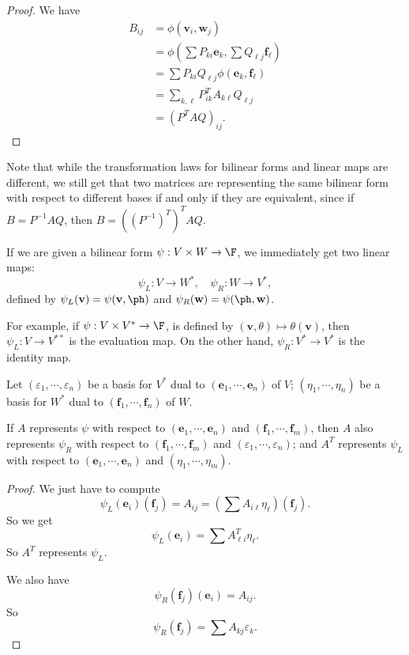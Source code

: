 \documentclass[a4paper]{article}
\begin{document}
\begin{proof}
  We have
  \begin{align*}
    B_{ij} &= \phi(\mathbf{v}_i, \mathbf{w}_j)\\
    &= \phi\left(\sum P_{ki}\mathbf{e}_k, \sum Q_{\ell j}\mathbf{f}_\ell\right)\\
    &= \sum P_{ki}Q_{\ell j}\phi(\mathbf{e}_k, \mathbf{f}_\ell)\\
    &= \sum_{k, \ell} P^T_{ik} A_{k\ell} Q_{\ell j}\\
    &= (P^T AQ)_{ij}.
  \end{align*}
\end{proof}
Note that while the transformation laws for bilinear forms and linear maps are different, we still get that two matrices are representing the same bilinear form with respect to different bases if and only if they are equivalent, since if $B = P^{-1} AQ$, then $B = ((P^{-1})^T)^T AQ$.

If we are given a bilinear form $\psi: V\times W \to \F$, we immediately get two linear maps:
\[
  \psi_L: V\to W^*,\quad \psi_R: W \to V^*,
\]
defined by $\psi_L(\mathbf{v}) = \psi(\mathbf{v}, \ph)$ and $\psi_R(\mathbf{w}) = \psi(\ph, \mathbf{w})$.

For example, if $\psi: V\times V^* \to \F$, is defined by $(\mathbf{v}, \theta) \mapsto \theta(\mathbf{v})$, then $\psi_L: V\to V^{**}$ is the evaluation map. On the other hand, $\psi_R: V^* \to V^*$ is the identity map.

\begin{lemma}
  Let $(\varepsilon_1,\cdots, \varepsilon_n)$ be a basis for $V^*$ dual to $(\mathbf{e}_1, \cdots, \mathbf{e}_n)$ of $V$; $(\eta_1,\cdots, \eta_n)$ be a basis for $W^*$ dual to $(\mathbf{f}_1, \cdots, \mathbf{f}_n)$ of $W$.

  If $A$ represents $\psi$ with respect to $(\mathbf{e}_1, \cdots, \mathbf{e}_n)$ and $(\mathbf{f}_1, \cdots, \mathbf{f}_m)$, then $A$ also represents $\psi_R$ with respect to $(\mathbf{f}_1,\cdots, \mathbf{f}_m)$ and $(\varepsilon_1, \cdots, \varepsilon_n)$; and $A^T$ represents $\psi_L$ with respect to $(\mathbf{e}_1, \cdots, \mathbf{e}_n)$ and $(\eta_1, \cdots, \eta_m)$.
\end{lemma}

\begin{proof}
  We just have to compute
  \[
    \psi_L(\mathbf{e}_i)(\mathbf{f}_j) = A_{ij} = \left(\sum A_{i\ell} \eta_\ell\right) (\mathbf{f}_j).
  \]
  So we get
  \[
    \psi_L(\mathbf{e}_i) = \sum A_{\ell i}^T\eta_\ell.
  \]
  So $A^T$ represents $\psi_L$.

  We also have
  \[
    \psi_R(\mathbf{f}_j)(\mathbf{e}_i) = A_{ij}.
  \]
  So
  \[
    \psi_R(\mathbf{f}_j) = \sum A_{kj}\varepsilon_k.
  \]
\end{proof}
\end{document}
